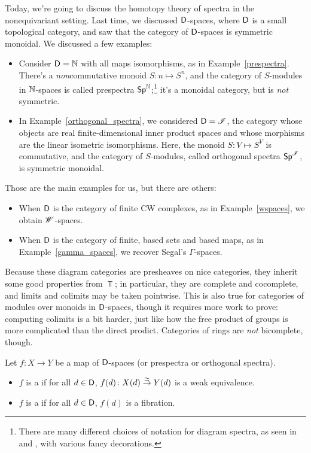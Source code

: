 Today, we're going to discuss the homotopy theory of spectra in the nonequivariant setting. Last time, we discussed
$\mathsf D$-spaces, where $\mathsf D$ is a small topological category, and saw that the category of $\mathsf D$-spaces is symmetric
monoidal. We discussed a few examples:
\begin{itemize}
	\item Consider $\mathsf D = \mathbb N$ with all maps isomorphisms, as in Example~\ref{prespectra}. There's a
	\emph{non}commutative monoid $S\colon n\mapsto S^n$, and the category of $S$-modules in $\mathbb N$-spaces is called
	prespectra $\mathsf{Sp}^\mathbb N$;\footnote{There are many different choices of notation for diagram spectra, as seen
	in~\cite{MMSS} and \cite{MandellMay}, with various fancy decorations.} it's a monoidal category, but is
	\emph{not} symmetric.
	\item In Example~\ref{orthogonal_spectra}, we considered $\mathsf D = \mathscr I$, the category whose objects are real
	finite-dimensional inner product spaces and whose morphisms are the linear isometric isomorphisms. Here, the
	monoid $S\colon V\mapsto S^V$ is commutative, and the category of $S$-modules, called orthogonal spectra
	$\mathsf{Sp}^\mathscr I$, is symmetric monoidal.
\end{itemize}
Those are the main examples for us, but there are others:
\begin{itemize}
	\item When $\mathsf D$ is the category of finite CW complexes, as in Example~\ref{wspaces}, we obtain $\mathscr W$-spaces.
	\item When $\mathsf D$ is the category of finite, based sets and based maps, as in Example~\ref{gamma_spaces}, we
	recover Segal's $\Gamma$-spaces.
\end{itemize}
Because these diagram categories are presheaves on nice categories, they inherit some good properties from $\Top$;
in particular, they are complete and cocomplete, and limits and colimits may be taken pointwise. This is also true
for categories of modules over monoids in $\mathsf D$-spaces, though it requires more work to prove: computing colimits
is a bit harder, just like how the free product of groups is more complicated than the direct prodict. Categories
of rings are \emph{not} bicomplete, though.
\begin{defn}
Let $f\colon X\to Y$ be a map of $\mathsf D$-spaces (or prespectra or orthogonal spectra).
\begin{itemize}
	\item $f$ is a  if for all $d\in\mathsf D$, $f(d)\colon X(d)\stackrel\simeq\to Y(d)$ is a weak
	equivalence.
	\item $f$ is a  if for all $d\in\mathsf D$, $f(d)$ is a fibration.
\end{itemize}
\end{defn}
